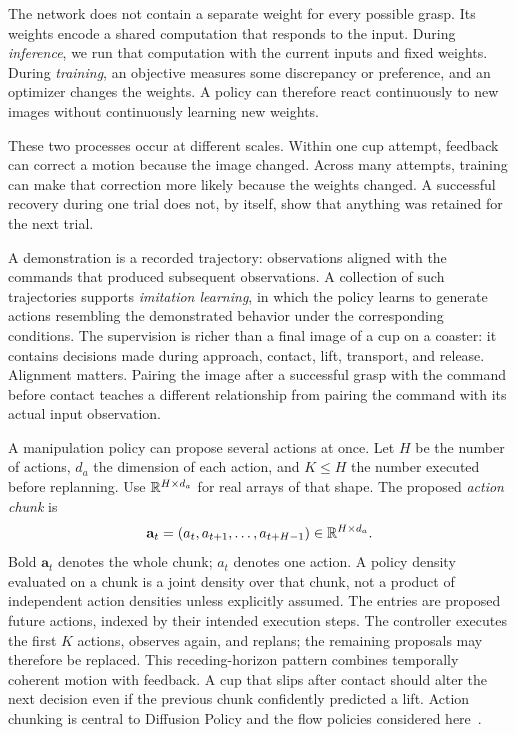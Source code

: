 The network does not contain a separate weight for every possible grasp. Its weights encode a shared computation that responds to the input. During \emph{inference}, we run that computation with the current inputs and fixed weights. During \emph{training}, an objective measures some discrepancy or preference, and an optimizer changes the weights. A policy can therefore react continuously to new images without continuously learning new weights.

These two processes occur at different scales. Within one cup attempt, feedback can correct a motion because the image changed. Across many attempts, training can make that correction more likely because the weights changed. A successful recovery during one trial does not, by itself, show that anything was retained for the next trial.

A demonstration is a recorded trajectory: observations aligned with the commands that produced subsequent observations. A collection of such trajectories supports \emph{imitation learning}, in which the policy learns to generate actions resembling the demonstrated behavior under the corresponding conditions. The supervision is richer than a final image of a cup on a coaster: it contains decisions made during approach, contact, lift, transport, and release. Alignment matters. Pairing the image after a successful grasp with the command before contact teaches a different relationship from pairing the command with its actual input observation.

A manipulation policy can propose several actions at once. Let $H$ be the number of actions, $d_a$ the dimension of each action, and $K\leq H$ the number executed before replanning. Use $\mathbb{R}^{H\times d_a}$ for real arrays of that shape. The proposed \emph{action chunk} is
\begin{equation}
 \mathbf a_t=(a_t,a_{t+1},\ldots,a_{t+H-1})\in\mathbb{R}^{H\times d_a}.
 \label{eq:chunk}
\end{equation}
Bold $\mathbf a_t$ denotes the whole chunk; $a_t$ denotes one action. A policy density evaluated on a chunk is a joint density over that chunk, not a product of independent action densities unless explicitly assumed. The entries are proposed future actions, indexed by their intended execution steps. The controller executes the first $K$ actions, observes again, and replans; the remaining proposals may therefore be replaced. This receding-horizon pattern combines temporally coherent motion with feedback. A cup that slips after contact should alter the next decision even if the previous chunk confidently predicted a lift. Action chunking is central to Diffusion Policy and the flow policies considered here~\citep{diffusionpolicy,pi0}.

